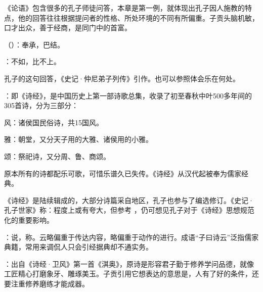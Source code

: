 {
《论语》包含很多的孔子师徒问答，本章是第一例，就体现出孔子因人施教的特点，他的回答往往根据提问者的性格、所处环境的不同有所偏重。子贡头脑机敏，口才出众，善于经商，是同门中的首富。
\begin{lyblobitemize}
\item {}（）：奉承，巴结。
\item {}：不如，比不上。

孔子的这句回答，《史记·仲尼弟子列传》引作。也可以参照体会乐在何处。

\item {}：即《诗经》，是中国历史上第一部诗歌总集，收录了初至春秋中叶500多年间的305首诗，分为三部分：
\begin{lyitemize}
\item 风：诸侯国民俗诗，共15国风。
\item 雅：朝堂，又分天子用的大雅、诸侯用的小雅。
\item 颂：祭祀诗，又分周、鲁、商颂。
\end{lyitemize}
原本所有的诗都配乐可歌，可惜乐谱久已失传。《诗经》从汉代起被奉为儒家经典。

《诗经》是陆续辑成的，大部分诗篇采自地区，孔子也参与了编选修订。《史记·孔子世家》称：程度上或有夸大，但参考 ，仍可想见孔子对于《诗经》思想规范化的重要影响。

\item {}：说，称。云略偏重于传达内容，略偏重于动作的进行。成语“子曰诗云”泛指儒家典籍，常用来调侃人只会引经据典却不通实务。
\item {}：出自《诗经·卫风》第一首《淇奥》，原诗是形容君子勤于修养学问品德，就像工匠精心打磨象牙、雕琢美玉。子贡引用它想表达的意思是，人有了好的条件，还要注重修养磨练才能成器。


\end{lyblobitemize}}
